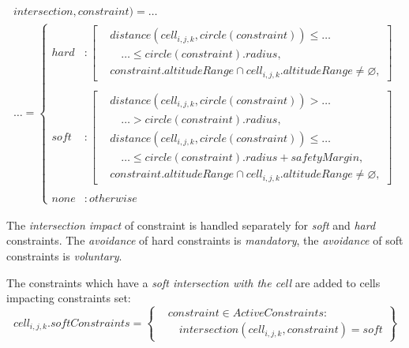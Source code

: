 \begin{multline}\label{eq:contraintToCellIntersection}
    intersection,constraint)=\dots\\\dots = 
    \begin{cases}
        hard &:\left[
            \begin{aligned}
                &distance(cell_{i,j,k},circle(constraint)) \le\dots\\ 
                &\quad\dots\le circle(constraint).radius,\\
                & constraint.altitude Range \cap cell_{i,j,k}.altitude Range \neq \varnothing,
            \end{aligned}\right]\\
             &\\
        soft &:\left[
            \begin{aligned}
                &distance(cell_{i,j,k},circle(constraint)) >\dots\\ 
                &\quad\dots > circle(constraint).radius,\\
                &distance(cell_{i,j,k},circle(constraint)) \le\dots\\ 
                &\quad\dots\le circle(constraint).radius + safety Margin,\\
                & constraint.altitude Range \cap cell_{i,j,k}.altitude Range \neq \varnothing,
            \end{aligned}\right]\\
             &\\
        none &:otherwise
    \end{cases}
\end{multline}

\noindent The \emph{intersection impact} of constraint is handled separately for \emph{soft} and  \emph{hard} constraints. The \emph{avoidance} of hard constraints is \emph{mandatory}, the \emph{avoidance} of soft constraints is \emph{voluntary}.

The constraints which have a \emph{soft intersection with the cell} are added to cells impacting constraints set: 
\begin{equation}\label{eq:softConstraintsCellIntersections}
    cell_{i,j,k}. soft Constraints = 
    \left\{
        \begin{aligned}
            &constraint \in Active Constraints:\\ 
            &\quad intersection(cell_{i,j,k},constraint) = soft
        \end{aligned}
    \right\}
\end{equation}

